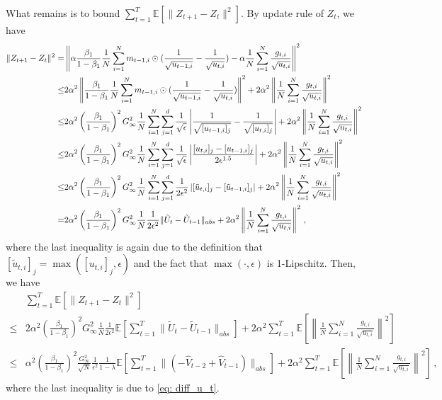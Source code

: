 \documentclass[11pt]{article}
\begin{document}
What remains is to bound $\sum_{t=1}^T \mathbb E\left[\| Z_{t+1}-  Z_{t}\|^2 \right]$. By update rule of $Z_t$, we have
\begin{align}\notag
\| Z_{t+1}-  Z_{t}\|^2 
 = &  \left\| \alpha \frac{\beta_1}{1-\beta_1}  \frac{1}{N} \sum_{i=1}^N m_{t-1	,i} \odot (\frac{1}{\sqrt{u_{t-1,i}}} - \frac{1}{\sqrt{u_{t,i}}}) - \alpha \frac{1}{N} \sum_{i=1}^N \frac{g_{t,i}}{\sqrt{u_{t,i}}} \right\|^2 \nonumber \\
\leq & 2 \alpha^2 \left\|  \frac{\beta_1}{1-\beta_1}  \frac{1}{N} \sum_{i=1}^N m_{t-1	,i} \odot (\frac{1}{\sqrt{u_{t-1,i}}} - \frac{1}{\sqrt{u_{t,i}}})\right\|^2 + 2 \alpha^2 \left\| \frac{1}{N} \sum_{i=1}^N \frac{g_{t,i}}{\sqrt{u_{t,i}}} \right\|^2 \nonumber \\
\leq & 2 \alpha^2 \left ( \frac{\beta_1}{1-\beta_1} \right)^2    G_{\infty} ^2 \frac{1}{N} \sum_{i=1}^N \sum_{j=1}^d   \frac{1}{\sqrt{\epsilon}}\left|\frac{1}{\sqrt{[u_{t-1,i}]_j}} - \frac{1}{\sqrt{[u_{t,i}]_j}}\right| + 2 \alpha^2 \left\| \frac{1}{N} \sum_{i=1}^N \frac{g_{t,i}}{\sqrt{u_{t,i}}} \right\|^2 \nonumber \\
\leq & 2 \alpha^2 \left ( \frac{\beta_1}{1-\beta_1} \right)^2    G_{\infty} ^2 \frac{1}{N} \sum_{i=1}^N \sum_{j=1}^d   \frac{1}{\sqrt{\epsilon}}\left|\frac{[u_{t,i}]_j - [u_{t-1,i}]_j }{2\epsilon^{1.5}}\right| + 2 \alpha^2 \left\| \frac{1}{N} \sum_{i=1}^N \frac{g_{t,i}}{\sqrt{u_{t,i}}} \right\|^2 \nonumber \\
\leq & 2 \alpha^2 \left ( \frac{\beta_1}{1-\beta_1} \right)^2    G_{\infty} ^2 \frac{1}{N} \sum_{i=1}^N \sum_{j=1}^d   \frac{1}{{2\epsilon^2}}\left|{[\tilde u_{t,i}]_j - [\tilde u_{t-1,i}]_j }\right| + 2 \alpha^2 \left\| \frac{1}{N} \sum_{i=1}^N \frac{g_{t,i}}{\sqrt{u_{t,i}}} \right\|^2 \nonumber \\
= & 2 \alpha^2 \left ( \frac{\beta_1}{1-\beta_1} \right)^2    G_{\infty} ^2 \frac{1}{N}   \frac{1}{{2\epsilon^2}}\|\tilde U_t - \tilde U_{t-1} \|_{abs} + 2 \alpha^2 \left\| \frac{1}{N} \sum_{i=1}^N \frac{g_{t,i}}{\sqrt{u_{t,i}}} \right\|^2 \, ,
\end{align}
where the last inequality is again due to the definition that $[\tilde u_{t,i}]_j = \max ([ u_{t,i}]_j ,\epsilon )$ and the fact that $\max(\cdot, \epsilon)$ is 1-Lipschitz. 
Then, we have
\begin{align}
& \sum_{t=1}^T \mathbb E [\| Z_{t+1}-  Z_{t}\|^2]  \nonumber  \\
\leq & 2 \alpha^2 \left ( \frac{\beta_1}{1-\beta_1} \right)^2    G_{\infty} ^2 \frac{1}{N}   \frac{1}{{2\epsilon^2}}  \mathbb E \left [\sum_{t=1}^T    \|\tilde U_t - \tilde U_{t-1} \|_{abs} \right] +  2 \alpha^2  \sum_{t=1}^T   \mathbb E \left[ \left\| \frac{1}{N} \sum_{i=1}^N \frac{g_{t,i}}{\sqrt{u_{t,i}}} \right\|^2 \right] \nonumber  \\
\leq &  \alpha^2 \left ( \frac{\beta_1}{1-\beta_1} \right)^2   \frac{ G_{\infty} ^2 }{\sqrt{N}}   \frac{1}{{\epsilon^2}} \frac{1}{1-\lambda}  \mathbb E \left [ \sum_{t=1}^T  \| ( - \hat V_{t-2} + \hat V_{t-1}) \|_{abs}\right] + 2 \alpha^2 \sum_{t=1}^T  \mathbb E\left[ \left\| \frac{1}{N} \sum_{i=1}^N \frac{g_{t,i}}{\sqrt{u_{t,i}}} \right\|^2 \right] \, , \nonumber 
\end{align}
where the last inequality is due to \eqref{eq: diff_u_t}.
\end{document}
